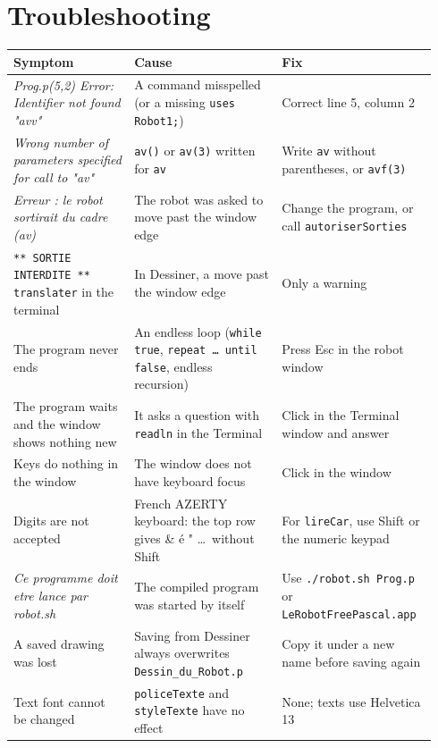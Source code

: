 \documentclass[11pt,a4paper]{article}
\newcommand{\kbd}[1]{\texttt{#1}}
\begin{document}
\section{Troubleshooting}

\begin{longtable}{@{}p{0.27\linewidth} p{0.33\linewidth} p{0.34\linewidth}@{}}
\toprule
\textbf{Symptom} & \textbf{Cause} & \textbf{Fix} \\
\midrule
\endhead
\bottomrule
\endfoot
\emph{Prog.p(5,2) Error: Identifier not found "avv"} & A command misspelled (or a missing \kbd{uses Robot1;}) & Correct line 5, column 2 \\
\addlinespace
\emph{Wrong number of parameters specified for call to "av"} & \kbd{av()} or \kbd{av(3)} written for \kbd{av} & Write \kbd{av} without parentheses, or \kbd{avf(3)} \\
\addlinespace
\emph{Erreur : le robot sortirait du cadre (av)} & The robot was asked to move past the window edge & Change the program, or call \kbd{autoriserSorties} \\
\addlinespace
\kbd{** SORTIE INTERDITE ** translater} in the terminal & In Dessiner, a move past the window edge & Only a warning \\
\addlinespace
The program never ends & An endless loop (\kbd{while true}, \kbd{repeat \dots\ until false}, endless recursion) & Press Esc in the robot window \\
\addlinespace
The program waits and the window shows nothing new & It asks a question with \kbd{readln} in the Terminal & Click in the Terminal window and answer \\
\addlinespace
Keys do nothing in the window & The window does not have keyboard focus & Click in the window \\
\addlinespace
Digits are not accepted & French AZERTY keyboard: the top row gives \& é " \dots\ without Shift & For \kbd{lireCar}, use Shift or the numeric keypad \\
\addlinespace
\emph{Ce programme doit etre lance par robot.sh} & The compiled program was started by itself & Use \kbd{./robot.sh Prog.p} or \kbd{LeRobotFreePascal.app} \\
\addlinespace
A saved drawing was lost & Saving from Dessiner always overwrites \kbd{Dessin\_du\_Robot.p} & Copy it under a new name before saving again \\
\addlinespace
Text font cannot be changed & \kbd{policeTexte} and \kbd{styleTexte} have no effect & None; texts use Helvetica 13 \\
\end{longtable}
\end{document}

